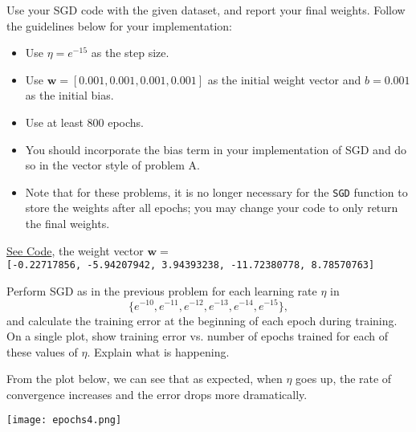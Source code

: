 \documentclass{article}
\begin{document}
\begin{problem}[6]
  Use your SGD code with the given dataset, and report your final weights. Follow the guidelines below for your implementation:

  \begin{itemize}
    \item Use $\eta = e^{-15}$ as the step size.  
    \item Use $\mathbf{w} = [0.001, 0.001, 0.001, 0.001]$ as the initial weight vector and $b = 0.001$ as the initial bias.
    \item Use at least 800 epochs.
    \item You should incorporate the bias term in your implementation of SGD and do so in the vector style of problem A.
    \item Note that for these problems, it is no longer necessary for the \texttt{SGD} function to store the weights after all epochs; you may change your code to only return the final weights.
  \end{itemize}
\end{problem}
\begin{solution}
\href{https://drive.google.com/file/d/1l7K6eNb4FilqpSvEQR3D_4_5f4qUrVp_/view?usp=sharing}{See Code}, the weight vector $\mathbf{w} =$\\
\verb|[-0.22717856, -5.94207942, 3.94393238, -11.72380778, 8.78570763]|
\end{solution}

\begin{problem}[2]
  Perform SGD as in the previous problem for each learning rate $\eta$ in \[\{e^{-10}, e^{-11}, e^{-12}, e^{-13}, e^{-14}, e^{-15}\},\] and calculate the training error at the beginning of each epoch during training.  On a single plot, show training error vs. number of epochs trained for each of these values of $\eta$. Explain what is happening.
\end{problem}
\begin{solution}
  From the plot below, we can see that as expected, when $\eta$ goes up, the rate of convergence increases and the error drops more dramatically.
  \begin{center}
    \texttt{[image: epochs4.png]}

\end{center}
\end{solution}
\end{document}
